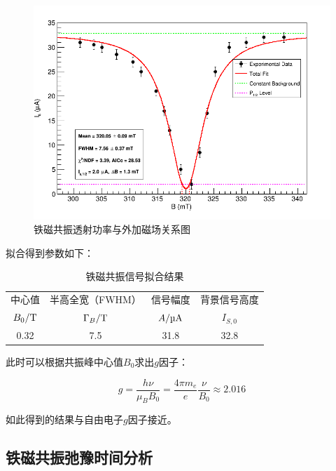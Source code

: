 \documentclass{thuemp}
\begin{document}
    \begin{figure}[H]
        \centering
        \includegraphics[width=0.9\linewidth]{../Data/FMR_ConstantBg_LorentzPeak.png}
        \caption{铁磁共振透射功率与外加磁场关系图} \label{fig:gmr_gradient}
    \end{figure}
    
    拟合得到参数如下：
    
    \begin{table}[H]
        \centering
        \captionnamefont{\wuhao\bf\heiti}
        \captiontitlefont{\wuhao\bf\heiti}
        \caption{铁磁共振信号拟合结果} \label{tab:FMR_fit}
        \liuhao
        \begin{tabular}{cccc}
            \toprule
            中心值 & 半高全宽（FWHM） & 信号幅度 & 背景信号高度 \\
            $B_0/\text{\si\tesla}$ & $\Gamma_B/\text{\si\tesla}$ & $A/\text{\si{\micro\ampere}}$ & $I_{S,0}$\\
            \midrule
            0.32 & 7.5 & 31.8 & 32.8 \\
            \bottomrule
        \end{tabular}
    \end{table}
    
    此时可以根据共振峰中心值$B_0$求出$g$因子：
    
    \begin{equation}
    g = \frac{h \nu}{\mu_B B_0} = \frac{4\pi m_e}{e} \frac{\nu}{B_0}\approx 2.016
    \end{equation}
    
    如此得到的结果与自由电子$g$因子接近。
    
    \subsection{铁磁共振弛豫时间分析}
    
\end{document}
